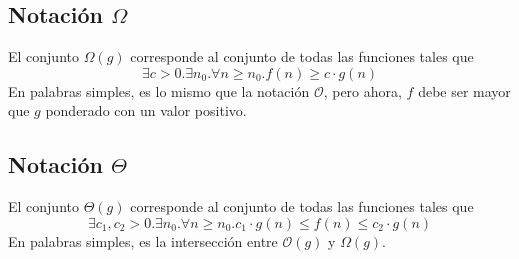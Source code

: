 \documentclass[../main.tex]{subfiles}
\begin{document}
\subsection{Notación $\Omega$}
El conjunto $\Omega(g)$ corresponde al conjunto de todas las funciones tales que
\[ \exists c > 0 . \exists n_0 . \forall n \geq n_0 . f(n) \geq c \cdot g(n) \]
En palabras simples, es lo mismo que la notación $\mathcal{O}$, pero ahora, $f$ debe ser mayor que $g$ ponderado con un valor positivo.

\subsection{Notación $\Theta$}
El conjunto $\Theta(g)$ corresponde al conjunto de todas las funciones tales que
\[ \exists c_1, c_2 > 0 . \exists n_0 . \forall n \geq n_0 . c_1 \cdot g(n) \leq f(n) \leq c_2 \cdot g(n) \]
En palabras simples, es la intersección entre $\mathcal{O}(g)$ y $\Omega(g)$.
\end{document}
